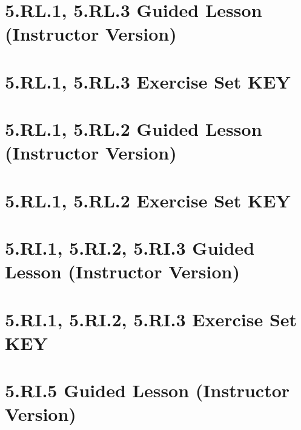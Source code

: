 \documentclass[a4paper,12pt]{article}
\title{}
\date{}
\begin{document}

\hypertarget{toc}{}
\tableofcontents
\newpage

\pagestyle{fancy}

\newpage
\section{5.RL.1, 5.RL.3 Guided Lesson (Instructor Version)}


\newpage
\section{5.RL.1, 5.RL.3 Exercise Set KEY}


\newpage
\section{5.RL.1, 5.RL.2 Guided Lesson (Instructor Version)}


\newpage
\section{5.RL.1, 5.RL.2 Exercise Set KEY}


\newpage
\section{5.RI.1, 5.RI.2, 5.RI.3 Guided Lesson (Instructor Version)}



\newpage
\section{5.RI.1, 5.RI.2, 5.RI.3 Exercise Set KEY}


\newpage
\section{5.RI.5 Guided Lesson (Instructor Version)}

\end{document}
